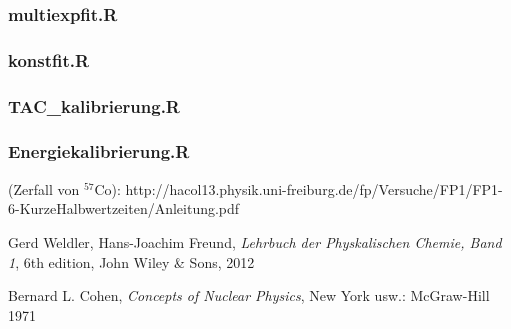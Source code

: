 \documentclass[12pt]{article}
\begin{document}
\subsubsection*{multiexpfit.R}\label{multiexpfit}

\subsubsection*{konstfit.R}\label{konstfit}

\subsubsection*{TAC\_kalibrierung.R}\label{tac}

\subsubsection*{Energiekalibrierung.R}\label{energie}



%


%



\newpage
\listoffigures


\newpage
\thispagestyle{empty}
\begin{thebibliography}{9}

 (Zerfall von $^{57}$Co): http://hacol13.physik.uni-freiburg.de/fp/Versuche/FP1/FP1-6-KurzeHalbwertzeiten/Anleitung.pdf
  
	Gerd Weldler, Hans-Joachim Freund,
	\emph{Lehrbuch der Physkalischen Chemie, Band 1},
	6th edition,
	John Wiley \& Sons,
	2012

Bernard L. Cohen,
\emph{Concepts of Nuclear Physics},
 New York usw.: McGraw-Hill 1971
  
  

\end{thebibliography}
\end{document}
